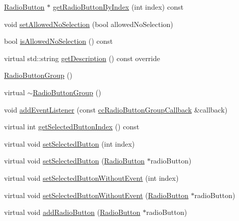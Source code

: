 \begin{DoxyCompactItemize}
\item 
\hyperlink{classui_1_1RadioButton}{Radio\+Button} $\ast$ \hyperlink{classui_1_1RadioButtonGroup_aecf59594acbf123c6ca8d21ef631f9ce}{get\+Radio\+Button\+By\+Index} (int index) const
\item 
void \hyperlink{classui_1_1RadioButtonGroup_ac59b251d0cb6b439412172dd98cd9491}{set\+Allowed\+No\+Selection} (bool allowed\+No\+Selection)
\item 
bool \hyperlink{classui_1_1RadioButtonGroup_a9eafb80fea9559a6838d46321063d79a}{is\+Allowed\+No\+Selection} () const
\item 
virtual std\+::string \hyperlink{classui_1_1RadioButtonGroup_adfabb4162d7b0f22d376feab245869a6}{get\+Description} () const override
\item 
\hyperlink{classui_1_1RadioButtonGroup_a68fedea375f325dcb934861768945c21}{Radio\+Button\+Group} ()
\item 
virtual \hyperlink{classui_1_1RadioButtonGroup_a776def3b3606e68b690e2a761d87fc84}{$\sim$\+Radio\+Button\+Group} ()
\item 
void \hyperlink{classui_1_1RadioButtonGroup_a22663b5cf32d32749ced9005888e937f}{add\+Event\+Listener} (const \hyperlink{classui_1_1RadioButtonGroup_a8385f08613e843c5977252ed03c37e22}{cc\+Radio\+Button\+Group\+Callback} \&callback)
\item 
virtual int \hyperlink{classui_1_1RadioButtonGroup_a0e7dbe4a90c81cc417fdbdde97ac2f12}{get\+Selected\+Button\+Index} () const
\item 
virtual void \hyperlink{classui_1_1RadioButtonGroup_af3e9d8ac63f54d12e53b3196cb8e5e4e}{set\+Selected\+Button} (int index)
\item 
virtual void \hyperlink{classui_1_1RadioButtonGroup_ab62049446b2b438d0734fbe3b7357671}{set\+Selected\+Button} (\hyperlink{classui_1_1RadioButton}{Radio\+Button} $\ast$radio\+Button)
\item 
virtual void \hyperlink{classui_1_1RadioButtonGroup_a3104bb14ad606a26338edde6f8cb89a7}{set\+Selected\+Button\+Without\+Event} (int index)
\item 
virtual void \hyperlink{classui_1_1RadioButtonGroup_aa9f825f30344b0abb0b7133bf90a3dcb}{set\+Selected\+Button\+Without\+Event} (\hyperlink{classui_1_1RadioButton}{Radio\+Button} $\ast$radio\+Button)
\item 
virtual void \hyperlink{classui_1_1RadioButtonGroup_a4c69239f0f782877e4aefb217f0e03f2}{add\+Radio\+Button} (\hyperlink{classui_1_1RadioButton}{Radio\+Button} $\ast$radio\+Button)
\item 

\end{DoxyCompactItemize}
